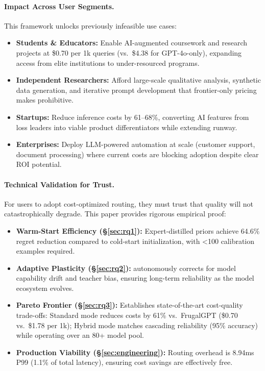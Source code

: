 \paragraph{Impact Across User Segments.} This framework unlocks previously infeasible use cases:

\begin{itemize}[leftmargin=*]
    \item \textbf{Students \& Educators:} Enable AI-augmented coursework and research projects at \$0.70 per 1k queries (vs.\ \$4.38 for GPT-4o-only), expanding access from elite institutions to under-resourced programs.
    \item \textbf{Independent Researchers:} Afford large-scale qualitative analysis, synthetic data generation, and iterative prompt development that frontier-only pricing makes prohibitive.
    \item \textbf{Startups:} Reduce inference costs by 61--68\%, converting AI features from loss leaders into viable product differentiators while extending runway.
    \item \textbf{Enterprises:} Deploy LLM-powered automation at scale (customer support, document processing) where current costs are blocking adoption despite clear ROI potential.
\end{itemize}

\paragraph{Technical Validation for Trust.} For users to adopt cost-optimized routing, they must trust that quality will not catastrophically degrade. This paper provides rigorous empirical proof:

\begin{itemize}[leftmargin=*]
    \item \textbf{Warm-Start Efficiency (\S\ref{sec:rq1}):} Expert-distilled priors achieve 64.6\% regret reduction compared to cold-start initialization, with <100 calibration examples required.
    \item \textbf{Adaptive Plasticity (\S\ref{sec:rq2}):} \ours{} autonomously corrects for model capability drift and teacher bias, ensuring long-term reliability as the model ecosystem evolves.
    \item \textbf{Pareto Frontier (\S\ref{sec:rq3}):} Establishes state-of-the-art cost-quality trade-offs: Standard mode reduces costs by 61\% vs.\ FrugalGPT (\$0.70 vs.\ \$1.78 per 1k); Hybrid mode matches cascading reliability (95\% accuracy) while operating over an 80+ model pool.
    \item \textbf{Production Viability (\S\ref{sec:engineering}):} Routing overhead is 8.94ms P99 (1.1\% of total latency), ensuring cost savings are effectively free.
\end{itemize}

